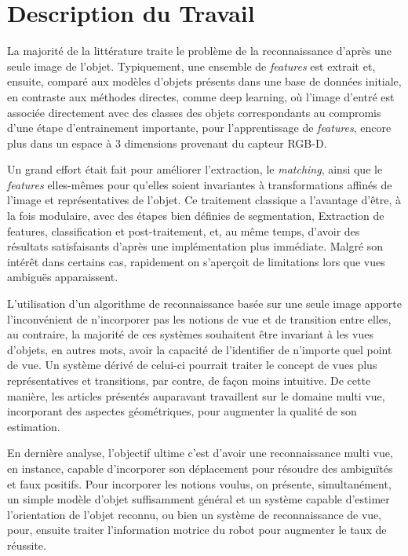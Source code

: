 
\chapter{Description du Travail}

La majorité de la littérature traite le problème de la reconnaissance d'après une seule image de l'objet. Typiquement, une ensemble de \textit{features} est extrait et, ensuite, comparé aux modèles d'objets présents dans une base de données initiale, en contraste aux méthodes directes, comme deep learning, où l'image d'entré est associée directement avec des classes des objets correspondants au compromis d'une étape d'entrainement importante, pour l'apprentissage de \textit {features}, encore plus dans un espace à 3 dimensions provenant du capteur RGB-D. 

Un grand effort était fait pour améliorer l'extraction, le \textit {matching}, ainsi que le \textit{features} elles-mêmes pour qu'elles soient invariantes à transformations affinés de l'image et représentatives de l'objet. Ce traitement classique a l’avantage d'être, à la fois modulaire, avec des étapes bien définies de segmentation, Extraction de features, classification et post-traitement, et, au même temps, d'avoir des résultats satisfaisants d’après une implémentation plus immédiate. Malgré son intérêt dans certains cas, rapidement on s’aperçoit de limitations lors que vues ambiguës apparaissent.

L'utilisation d'un algorithme de reconnaissance basée sur une seule image apporte l'inconvénient de
n'incorporer pas les notions de vue et de transition entre elles, au contraire, la majorité de ces systèmes souhaitent être invariant à les
vues d'objets, en autres mots, avoir la capacité de l'identifier de n'importe quel point de vue. Un système dérivé de celui-ci pourrait
traiter le concept de vues plus représentatives et transitions, par contre, de façon moins intuitive. De cette manière, les articles présentés
auparavant travaillent sur le domaine multi vue, incorporant des aspectes géométriques, pour augmenter la qualité de son estimation.

En dernière analyse, l'objectif ultime c'est d'avoir une reconnaissance multi vue, en
instance, capable d'incorporer son déplacement pour résoudre des
ambiguïtés et faux positifs. Pour incorporer les notions voulus, on présente, simultanément,
un simple modèle d’objet suffisamment général et un système capable
d'estimer l'orientation de l'objet reconnu, ou bien un système de
reconnaissance de vue, pour, ensuite traiter l’information motrice du
robot pour augmenter le taux de réussite.

